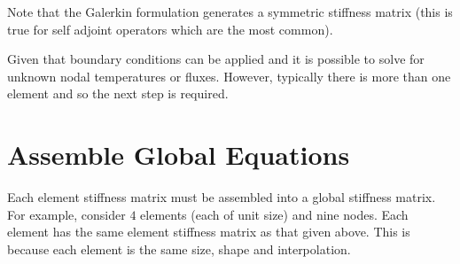 Note that the Galerkin formulation generates a symmetric stiffness matrix (this is
true for self adjoint operators which are the most common).

Given that boundary conditions can be applied and it is possible to solve for 
unknown nodal temperatures or fluxes. 
However, typically there is more than one element and so the next step is required.

\section{Assemble Global Equations}

Each element stiffness matrix must be assembled into a global stiffness
matrix.  For example, consider $4$ elements (each of unit size) and nine nodes. Each
element has the same element stiffness matrix as that given above. This is
because each element is the same size, shape and interpolation.


